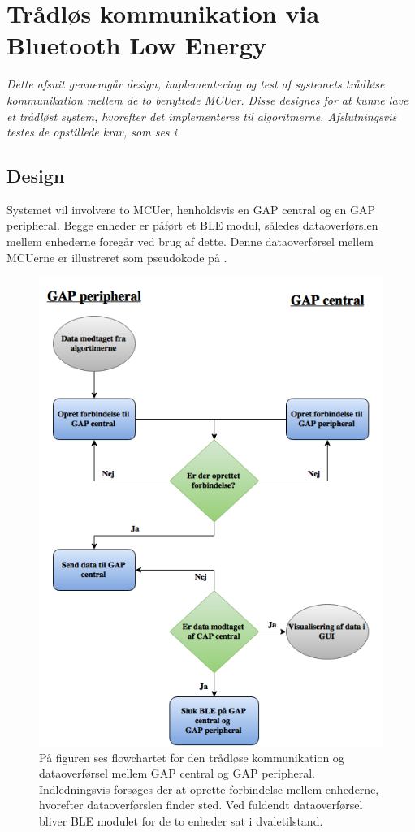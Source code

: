 \section{Trådløs kommunikation via Bluetooth Low Energy}
\textit{Dette afsnit gennemgår design, implementering og test af systemets trådløse kommunikation mellem de to benyttede MCUer. Disse designes for at kunne lave et trådløst system, hvorefter det implementeres til algoritmerne. Afslutningsvis testes de opstillede krav, som ses i }

\subsection{Design}
Systemet vil involvere to MCUer, henholdsvis en GAP central og en GAP peripheral. Begge enheder er påført et BLE modul, således dataoverførslen mellem enhederne foregår ved brug af dette. Denne dataoverførsel mellem MCUerne er illustreret som pseudokode på . 
\begin{figure}[H]
	\centering
	\includegraphics[scale=0.5]{figures/cDesign/blue_pseudo.png}
	\caption{På figuren ses flowchartet for den trådløse kommunikation og dataoverførsel mellem GAP central og GAP peripheral. Indledningsvis forsøges der at oprette forbindelse mellem enhederne, hvorefter dataoverførslen finder sted. Ved fuldendt dataoverførsel bliver BLE modulet for de to enheder sat i dvaletilstand.}
	\label{fig:blue_pseudo}
\end{figure}
